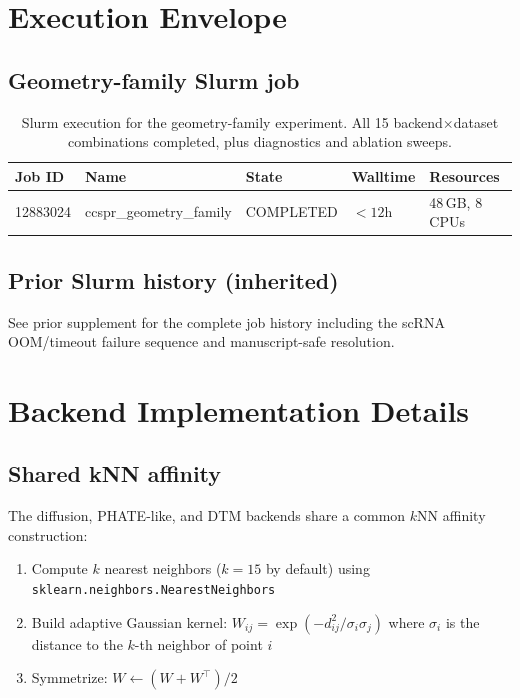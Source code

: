 \documentclass[11pt]{article}
\begin{document}
\section{Execution Envelope}
\label{sec:execution}

\subsection{Geometry-family Slurm job}

\begin{table}[h]
\centering
\small
\begin{tabular}{lllll}
\toprule
Job ID & Name & State & Walltime & Resources \\
\midrule
12883024 & ccspr\_geometry\_family & COMPLETED & $< 12$h & 48\,GB, 8 CPUs \\
\bottomrule
\end{tabular}
\caption{Slurm execution for the geometry-family experiment.
All 15 backend$\times$dataset combinations completed, plus diagnostics and ablation sweeps.}
\label{tab:geom_job}
\end{table}

\subsection{Prior Slurm history (inherited)}
See prior supplement for the complete job history including the scRNA OOM/timeout failure sequence and manuscript-safe resolution.

\section{Backend Implementation Details}
\label{sec:impl}

\subsection{Shared kNN affinity}
The diffusion, PHATE-like, and DTM backends share a common $k$NN affinity construction:
\begin{enumerate}[leftmargin=1.5em]
\item Compute $k$ nearest neighbors ($k=15$ by default) using \texttt{sklearn.neighbors.NearestNeighbors}
\item Build adaptive Gaussian kernel: $W_{ij} = \exp(-d_{ij}^2 / \sigma_i \sigma_j)$ where $\sigma_i$ is the distance to the $k$-th neighbor of point $i$
\item Symmetrize: $W \leftarrow (W + W^\top) / 2$
\end{enumerate}
\end{document}
